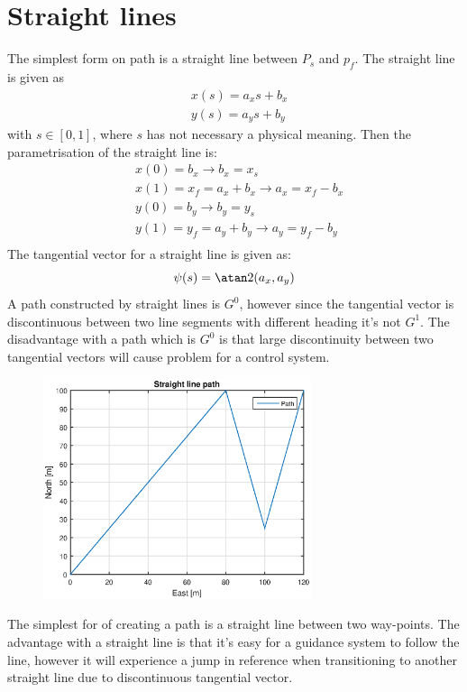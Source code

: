 \section{Straight lines}
The simplest form on path is a straight line between $P_s$ and $p_f$. The straight line is given as 
\begin{subequations}
\begin{align}
& x(s) = a_xs + b_x \\
& y(s) = a_ys + b_y 
\end{align}
\end{subequations}
with $ s \in [0,1] $, where $s$ has not necessary a physical meaning. Then the parametrisation of the straight line is:
\begin{subequations}
\begin{align}
& x(0) = b_x \rightarrow b_x = x_s \\
& x(1) = x_f = a_x + b_x \rightarrow a_x = x_f - b_x \\
& y(0) = b_y \rightarrow b_y = y_s \\
& y(1) = y_f = a_y + b_y \rightarrow a_y = y_f - b_y \\
\end{align}
\end{subequations}
The tangential vector for a straight line is given as:
\begin{equation}
\psi(s) = \atan2(a_x,a_y)
\end{equation}
A path constructed by straight lines is $G^0$, however since the tangential vector is discontinuous between two line segments with different heading it's not $G^1$. The disadvantage with a path which is $G^0$ is that large discontinuity between two tangential vectors will cause problem for a control system. 
\begin{figure}[H]
\includegraphics[width=0.7\textwidth]{figs/TheoryPlot/StraightLine.eps}
\end{figure}
The simplest for of creating a path is a straight line between two way-points. The advantage with a straight line is that it's easy for a guidance system to follow the line, however it will experience a jump in reference when transitioning to another straight line due to discontinuous tangential vector.
